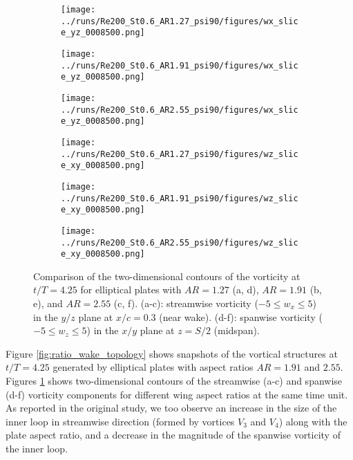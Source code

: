 \begin{figure}
  \centering
  \begin{subfigure}[c]{0.3\textwidth}
    \centering
    \texttt{[image: ../runs/Re200\_St0.6\_AR1.27\_psi90/figures/wx\_slice\_yz\_0008500.png]}
    \caption{}
  \end{subfigure}
  \begin{subfigure}[c]{0.3\textwidth}
    \centering
    \texttt{[image: ../runs/Re200\_St0.6\_AR1.91\_psi90/figures/wx\_slice\_yz\_0008500.png]}
    \caption{}
  \end{subfigure}
  \begin{subfigure}[c]{0.34\textwidth}
    \centering
    \texttt{[image: ../runs/Re200\_St0.6\_AR2.55\_psi90/figures/wx\_slice\_yz\_0008500.png]}
    \caption{}
  \end{subfigure}
  \vspace{0.5cm}
  \begin{subfigure}[c]{0.32\textwidth}
    \centering
    \texttt{[image: ../runs/Re200\_St0.6\_AR1.27\_psi90/figures/wz\_slice\_xy\_0008500.png]}
    \caption{}
  \end{subfigure}
  \begin{subfigure}[c]{0.32\textwidth}
    \centering
    \texttt{[image: ../runs/Re200\_St0.6\_AR1.91\_psi90/figures/wz\_slice\_xy\_0008500.png]}
    \caption{}
  \end{subfigure}
  \begin{subfigure}[c]{0.32\textwidth}
    \centering
    \texttt{[image: ../runs/Re200\_St0.6\_AR2.55\_psi90/figures/wz\_slice\_xy\_0008500.png]}
    \caption{}
  \end{subfigure}
  \caption{Comparison of the two-dimensional contours of the vorticity at $t/T = 4.25$ for elliptical plates with $AR = 1.27$ (a, d), $AR = 1.91$ (b, e), and $AR = 2.55$ (c, f). (a-c): streamwise vorticity ($-5 \leq w_x \leq 5$) in the $y/z$ plane at $x/c = 0.3$ (near wake). (d-f): spanwise vorticity ($-5 \leq w_z \leq 5$) in the $x/y$ plane at $z = S/2$ (midspan).}
  \label{fig:ratio_vorticity_slices}
\end{figure}

Figure \ref{fig:ratio_wake_topology} shows snapshots of the vortical structures at $t/T = 4.25$ generated by elliptical plates with aspect ratios $AR = 1.91$ and $2.55$.
Figures \ref{fig:ratio_vorticity_slices} shows two-dimensional contours of the streamwise (a-c) and spanwise (d-f) vorticity components for different wing aspect ratios at the same time unit.
As reported in the original study, we too observe an increase in the size of the inner loop in streamwise direction (formed by vortices $V_3$ and $V_4$) along with the plate aspect ratio, and a decrease in the magnitude of the spanwise vorticity of the inner loop.

